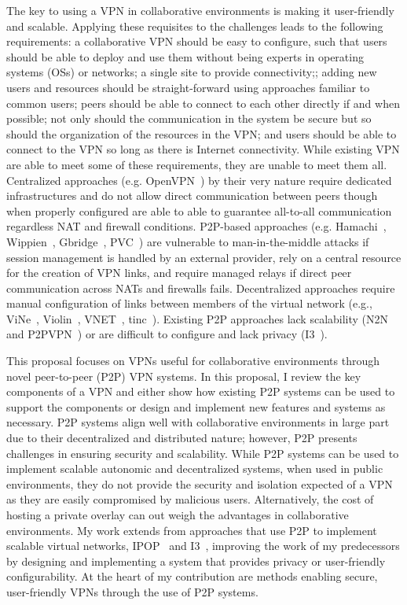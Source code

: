 The key to using a VPN in collaborative environments is making it user-friendly
and scalable.  Applying these requisites to the challenges leads to the
following requirements:  a collaborative VPN should be easy to configure, such
that users should be able to deploy and use them without being experts in
operating systems (OSs) or networks; a single site to provide connectivity;;
adding new users and resources should be straight-forward using approaches
familiar to common users; peers should be able to connect to each other directly
if and when possible; not only should the communication in the system be secure
but so should the organization of the resources in the VPN; and users should be
able to connect to the VPN so long as there is Internet connectivity.  While
existing VPN are able to meet some of these requirements, they are unable to
meet them all.  Centralized approaches (e.g.  OpenVPN~\cite{openvpn}) by their
very nature require dedicated infrastructures and do not allow direct
communication between peers though when properly configured are able to able
to guarantee all-to-all communication regardless NAT and firewall conditions.
P2P-based approaches (e.g. Hamachi~\cite{hamachi}, Wippien~\cite{wippien},
Gbridge~\cite{gbridge}, PVC~\cite{pvc}) are vulnerable to man-in-the-middle
attacks if session management is handled by an external provider, rely on a
central resource for the creation of VPN links, and require managed relays if
direct peer communication across NATs and firewalls fails.  Decentralized
approaches require manual configuration of links between members of the virtual
network (e.g., ViNe~\cite{vine}, Violin~\cite{violin}, VNET~\cite{vnet},
tinc~\cite{tinc}).  Existing P2P approaches lack scalability (N2N~\cite{n2n}
and P2PVPN~\cite{p2pvpn}) or are difficult to configure and lack privacy
(I3~\cite{i3}).

This proposal focuses on VPNs useful for collaborative environments through
novel peer-to-peer (P2P) VPN systems.  In this proposal, I review the key
components of a VPN and either show how existing P2P systems can be used to
support the components or design and implement new features and systems as
necessary.  P2P systems align well with collaborative environments in large
part due to their decentralized and distributed nature; however, P2P presents
challenges in ensuring security and scalability.  While P2P systems can be used
to implement scalable autonomic and decentralized systems, when used in public
environments, they do not provide the security and isolation expected of a VPN
as they are easily compromised by malicious users.  Alternatively, the cost of
hosting a private overlay can out weigh the advantages in collaborative
environments.  My work extends from approaches that use P2P to implement
scalable virtual networks, IPOP~\cite{ipop} and I3~\cite{i3}, improving the work
of my predecessors by designing and implementing a system that provides privacy
or user-friendly configurability.  At the heart of my contribution are methods
enabling secure, user-friendly VPNs through the use of P2P systems.

